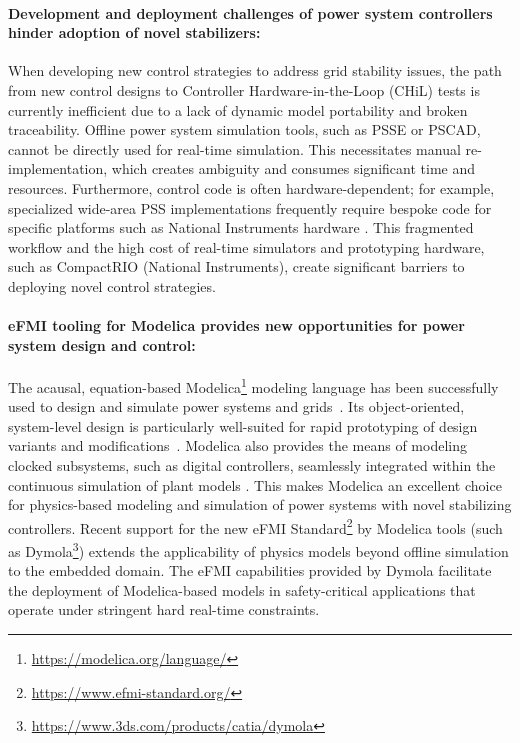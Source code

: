 \paragraph{Development and deployment challenges of power system controllers hinder adoption of novel stabilizers:} When developing new control strategies to address grid stability issues, the path from new control designs to Controller Hardware-in-the-Loop (CHiL) tests is currently inefficient due to a lack of dynamic model portability and broken traceability. Offline power system simulation tools, such as PSS\regtm{}E or PSCAD\regtm{}, cannot be directly used for real-time simulation. This necessitates manual re-implementation, which creates ambiguity and consumes significant time and resources. Furthermore, control code is often hardware-dependent; for example, specialized wide-area PSS implementations frequently require bespoke code for specific platforms such as National Instruments\regtm{} hardware \cite{Rebello2020}. This fragmented workflow and the high cost of real-time simulators and prototyping hardware, such as CompactRIO\regtm{} (National Instruments), create significant barriers to deploying novel control strategies.

\paragraph{eFMI tooling for Modelica provides new opportunities for power system design and control:} The acausal, equation-based Modelica\regtm{}\footnote{\label{fnt:modelica}\tiny{\url{https://modelica.org/language/}}} modeling language has been successfully used to design and simulate power systems and grids~\cite{ipsl,openipsl}. Its object-oriented, system-level design is particularly well-suited for rapid prototyping of design variants and modifications~\cite{Burger2019}. Modelica also provides the means of modeling clocked subsystems, such as digital controllers, seamlessly integrated within the continuous simulation of plant models \cite{Elmqvist2012}. This makes Modelica an excellent choice for physics-based modeling and simulation of power systems with novel stabilizing controllers. Recent support for the new eFMI\regtm{} Standard\footnote{\label{fnt:efmi-website}\tiny{\url{https://www.efmi-standard.org/}}} \cite{eFMI_Standard} by Modelica tools (such as Dymola\regtm{}\footnote{\label{fnt:dymola}\tiny{\url{https://www.3ds.com/products/catia/dymola}}}) extends the applicability of physics models beyond offline simulation to the embedded domain. The eFMI capabilities provided by Dymola facilitate the deployment of Modelica-based models in safety-critical applications that operate under stringent hard real-time constraints.
